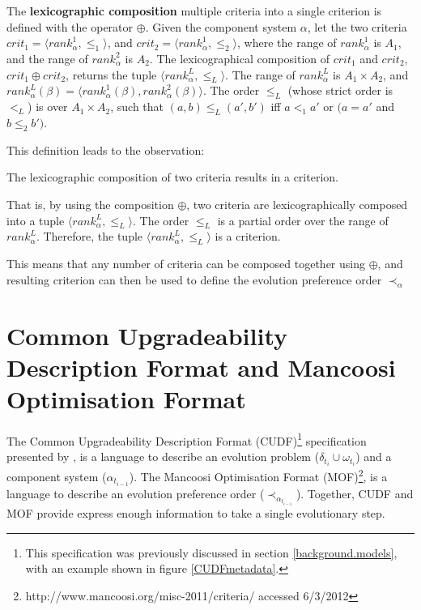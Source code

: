 \begin{defs}
\label{formal.defcritlex}
The \textbf{lexicographic composition} multiple criteria into a single criterion is defined with the operator $\oplus$.
Given the component system $\alpha$, let the two criteria $crit_1 = \langle rank^1_{\alpha}, \leq_{1} \rangle$, and $crit_2 = \langle rank^1_{\alpha}, \leq_{2} \rangle$,
where the range of $rank^1_{\alpha}$ is $A_1$, and the range of $rank^2_{\alpha}$ is $A_2$.
The lexicographical composition of $crit_1$ and $crit_2$, $crit_1 \oplus crit_2$, returns the tuple $\langle rank^L_{\alpha},\leq_L \rangle$.
The range of $rank^L_{\alpha}$ is $A_1 \times A_2$, and $rank^L_{\alpha}(\beta) = \langle rank^1_{\alpha}(\beta),rank^2_{\alpha}(\beta) \rangle$.
The order $\leq_L$ (whose strict order is $<_L$) is over $A_1 \times A_2$, such that $(a,b) \leq_L (a',b')$ iff $a <_1 a'$ or $(a = a'$ and $b \leq_2 b')$.
\end{defs}

This definition leads to the observation:
\begin{obs}
The lexicographic composition of two criteria results in a criterion.
\end{obs}
That is, by using the composition $\oplus$, two criteria are lexicographically composed into a tuple $\langle rank^L_{\alpha},\leq_L \rangle$.
The order $\leq_L$ is a partial order over the range of $rank^L_{\alpha}$.
Therefore, the tuple  $\langle rank^L_{\alpha},\leq_L \rangle$ is a criterion.

This means that any number of criteria can be composed together using $\oplus$,
and resulting criterion can then be used to define the evolution preference order $\prec_{\alpha}$

\section{Common Upgradeability Description Format and Mancoosi Optimisation Format}
\label{formal.cudf}
The Common Upgradeability Description Format (CUDF)\footnote{This specification was previously discussed in section \ref{background.models}, with an example shown in figure \ref{CUDFmetadata}.
}
specification presented by \citep{treinen2009common}, is a language to describe an evolution problem ($\delta_{t_i} \cup \omega_{t_i}$) and a component system ($\alpha_{t_{i-1}}$). 
The Mancoosi Optimisation Format (MOF)\footnote{http://www.mancoosi.org/misc-2011/criteria/ accessed 6/3/2012}, is a language to describe an evolution preference order ($\prec_{\alpha_{t_{i-1}}}$).
Together, CUDF and MOF provide express enough information to take a single evolutionary step.

